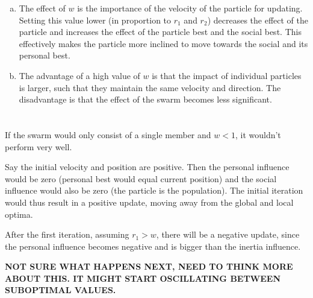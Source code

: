 \documentclass[11pt]{article}
\begin{document}
\begin{enumerate}[(a)]
\item The effect of $w$ is the importance of the velocity of the particle for updating. Setting this value lower (in proportion to $r_1$ and $r_2$) decreases the effect of the particle and increases the effect of the particle best and the social best. This effectively makes the particle more inclined to move towards the social and its personal best.

\item The advantage of a high value of $w$ is that the impact of individual particles is larger, such that they maintain the same velocity and direction. The disadvantage is that the effect of the swarm becomes less significant.
\end{enumerate}

\section{}
If the swarm would only consist of a single member and $w < 1$, it wouldn't perform very well. 

Say the initial velocity and position are positive. Then the personal influence would be zero (personal best would equal current position) and the social influence would also be zero (the particle is the population). The initial iteration would thus result in a positive update, moving away from the global and local optima. 

After the first iteration, assuming $r_1 > w$, there will be a negative update, since the personal influence becomes negative and is bigger than the inertia influence.

\textbf{NOT SURE WHAT HAPPENS NEXT, NEED TO THINK MORE ABOUT THIS. IT MIGHT START OSCILLATING BETWEEN SUBOPTIMAL VALUES.}
\end{document}
